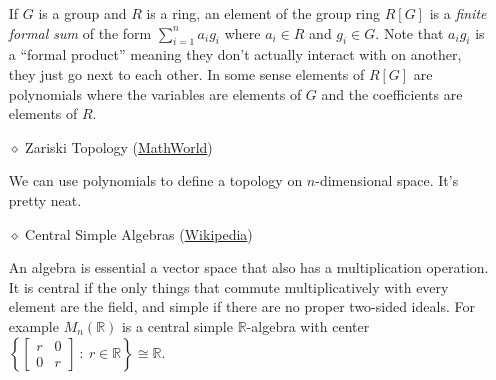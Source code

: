 \documentclass[12pt]{article}
\newcommand{\R}{\mathbb{R}}
\begin{document}
\begin{itemize}
			If $G$ is a group and $R$ is a ring, an element of the group ring $R[G]$ is a \textit{finite formal sum} of the form 
$\sum_{i=1}^n a_i g_i$ where $a_i\in R$ and $g_i\in G$.  Note that $a_i g_i$ is a ``formal product'' meaning they don't actually interact with on another, they just go next to each other.  In some sense elements of $R[G]$ are polynomials where the variables are elements of $G$ and the coefficients are elements of $R$.  

		\item[$\diamond$] Zariski Topology (\href{https://mathworld.wolfram.com/ZariskiTopology.html}{MathWorld})

			We can use polynomials to define a topology on $n$-dimensional space.  It's pretty neat.
		\item [$\diamond$] Central Simple Algebras (\href{https://en.wikipedia.org/wiki/Central_simple_algebra}{Wikipedia})
		
			An algebra is essential a vector space that also has a multiplication operation.  It is central if the only things that commute multiplicatively with every element are the field, and simple if there are no proper two-sided ideals.  For example $M_n(\R)$ is a central simple $\R$-algebra with center $\left\{\begin{bmatrix}r&0\\0&r\end{bmatrix}\ :\ r\in \R\right\}\cong \R$.
	\end{itemize}
			
\end{document}

